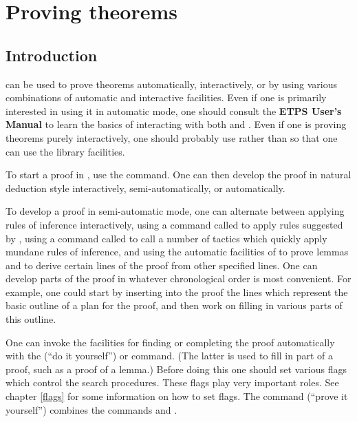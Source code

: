 \chapter{Proving theorems}
\label{proving}

\section{Introduction}


{\TPS} can be used to prove theorems automatically, interactively, or by
using various combinations of automatic and interactive facilities.
Even if one is primarily interested in using it in automatic mode, one
should consult the {\bf ETPS User's Manual} \cite{AndrewsTPS88b} to
learn the basics of interacting with both {\ETPS} and {\TPS}.  Even if one
is proving theorems purely interactively, one should probably use {\TPS}
rather than {\ETPS} so that one can use the library facilities.

To start a proof in {\TPS}, use the  command. One can
then develop the proof in natural deduction style
interactively, semi-automatically, or
automatically.

To develop a proof in semi-automatic mode, 
one can alternate between applying rules of inference interactively,
using a command called  to apply rules suggested by
{\TPS}, using a command called  to call a number of
tactics which quickly apply mundane rules of inference, and using the
automatic facilities of {\TPS} to prove lemmas and to derive certain
lines of the proof from other specified lines.  One can develop parts
of the proof in whatever chronological order is most convenient. For
example, one could start by inserting into the proof the lines which
represent the basic outline of a plan for the proof, and then work on
filling in various parts of this outline.

One can invoke the facilities for finding or completing the proof
automatically with the  (``do it yourself'')
or  command. (The latter is used to fill in part of
a proof, such as a proof of a lemma.)
Before doing this one should set various flags which control the
search procedures. These flags play very important roles.  See chapter
\ref{flags} for some information on how to set flags.
The command  (``prove it yourself'') combines
the commands  and .

